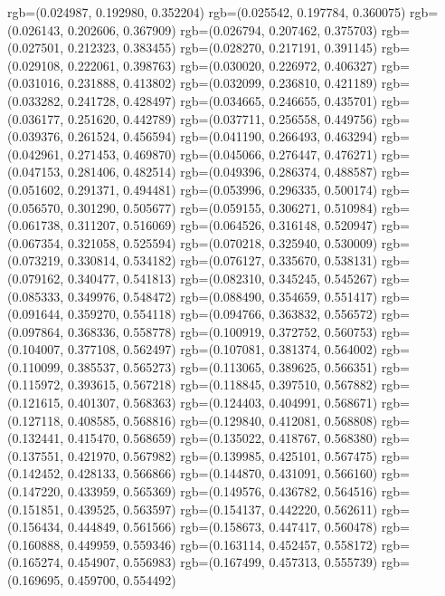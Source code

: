 {{{					rgb=(0.024987, 0.192980, 0.352204)
					rgb=(0.025542, 0.197784, 0.360075)
					rgb=(0.026143, 0.202606, 0.367909)
					rgb=(0.026794, 0.207462, 0.375703)
					rgb=(0.027501, 0.212323, 0.383455)
					rgb=(0.028270, 0.217191, 0.391145)
					rgb=(0.029108, 0.222061, 0.398763)
					rgb=(0.030020, 0.226972, 0.406327)
					rgb=(0.031016, 0.231888, 0.413802)
					rgb=(0.032099, 0.236810, 0.421189)
					rgb=(0.033282, 0.241728, 0.428497)
					rgb=(0.034665, 0.246655, 0.435701)
					rgb=(0.036177, 0.251620, 0.442789)
					rgb=(0.037711, 0.256558, 0.449756)
					rgb=(0.039376, 0.261524, 0.456594)
					rgb=(0.041190, 0.266493, 0.463294)
					rgb=(0.042961, 0.271453, 0.469870)
					rgb=(0.045066, 0.276447, 0.476271)
					rgb=(0.047153, 0.281406, 0.482514)
					rgb=(0.049396, 0.286374, 0.488587)
					rgb=(0.051602, 0.291371, 0.494481)
					rgb=(0.053996, 0.296335, 0.500174)
					rgb=(0.056570, 0.301290, 0.505677)
					rgb=(0.059155, 0.306271, 0.510984)
					rgb=(0.061738, 0.311207, 0.516069)
					rgb=(0.064526, 0.316148, 0.520947)
					rgb=(0.067354, 0.321058, 0.525594)
					rgb=(0.070218, 0.325940, 0.530009)
					rgb=(0.073219, 0.330814, 0.534182)
					rgb=(0.076127, 0.335670, 0.538131)
					rgb=(0.079162, 0.340477, 0.541813)
					rgb=(0.082310, 0.345245, 0.545267)
					rgb=(0.085333, 0.349976, 0.548472)
					rgb=(0.088490, 0.354659, 0.551417)
					rgb=(0.091644, 0.359270, 0.554118)
					rgb=(0.094766, 0.363832, 0.556572)
					rgb=(0.097864, 0.368336, 0.558778)
					rgb=(0.100919, 0.372752, 0.560753)
					rgb=(0.104007, 0.377108, 0.562497)
					rgb=(0.107081, 0.381374, 0.564002)
					rgb=(0.110099, 0.385537, 0.565273)
					rgb=(0.113065, 0.389625, 0.566351)
					rgb=(0.115972, 0.393615, 0.567218)
					rgb=(0.118845, 0.397510, 0.567882)
					rgb=(0.121615, 0.401307, 0.568363)
					rgb=(0.124403, 0.404991, 0.568671)
					rgb=(0.127118, 0.408585, 0.568816)
					rgb=(0.129840, 0.412081, 0.568808)
					rgb=(0.132441, 0.415470, 0.568659)
					rgb=(0.135022, 0.418767, 0.568380)
					rgb=(0.137551, 0.421970, 0.567982)
					rgb=(0.139985, 0.425101, 0.567475)
					rgb=(0.142452, 0.428133, 0.566866)
					rgb=(0.144870, 0.431091, 0.566160)
					rgb=(0.147220, 0.433959, 0.565369)
					rgb=(0.149576, 0.436782, 0.564516)
					rgb=(0.151851, 0.439525, 0.563597)
					rgb=(0.154137, 0.442220, 0.562611)
					rgb=(0.156434, 0.444849, 0.561566)
					rgb=(0.158673, 0.447417, 0.560478)
					rgb=(0.160888, 0.449959, 0.559346)
					rgb=(0.163114, 0.452457, 0.558172)
					rgb=(0.165274, 0.454907, 0.556983)
					rgb=(0.167499, 0.457313, 0.555739)
					rgb=(0.169695, 0.459700, 0.554492)
}}}
